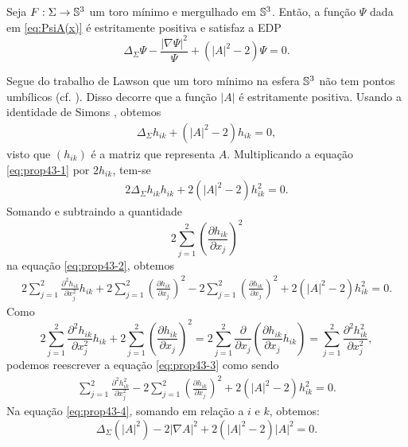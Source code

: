 \begin{proposicao}\label{edp_principal}
Seja $F:\Sigma\to\mathbb{S}^3$ um toro m\'inimo e mergulhado em $\mathbb{S}^3$.
Então, a função $\Psi$ dada em \eqref{eq:PsiA(x)} \'e estritamente 
positiva e satisfaz a EDP
\[
\Delta_\Sigma \Psi - \frac{|\nabla \Psi|^2}{\Psi} + (|A|^2 - 2) \Psi = 0.
\]
\end{proposicao}
\begin{demonstracao}
Segue do trabalho de Lawson que um toro m\'inimo na esfera $\mathbb{S}^3$
n\~ao tem pontos umb\'ilicos (cf. \cite[Proposition 1.5]{Lawson1970}).
Disso decorre que a função $|A|$ \'e estritamente positiva. Usando a
identidade de Simons \cite[Theorem 5.3.1]{Simons1968}, obtemos
\begin{eqnarray} \label{eq:prop43-1}
\Delta_{\Sigma} h_{ik} + (|A|^2 - 2)h_{ik} = 0,
\end{eqnarray}	
visto que $(h_{ik})$ \'e a matriz que representa $A$. Multiplicando a
equa\c c\~ao \eqref{eq:prop43-1} por $2 h_{ik}$, tem-se
\begin{eqnarray} \label{eq:prop43-2}
2 \Delta_{\Sigma} h_{ik} h_{ik} + 2 (|A|^2 - 2)h_{ik}^2 = 0.
\end{eqnarray}	
Somando e subtraindo a quantidade
\[
2 \sum_{j=1}^2 \left( \frac{\partial h_{ik}}{\partial x_j} \right)^2
\]
na equa\c c\~ao \eqref{eq:prop43-2}, obtemos
\begin{eqnarray} \label{eq:prop43-3}
2 \sum_{j=1}^2 \frac{\partial^2 h_{ik}}{\partial x_j^2} h_{ik} + 2 \sum_{j=1}^2 \left( \frac{\partial h_{ik}}{\partial x_j} \right)^2 - 2 \sum_{j=1}^2 \left( \frac{\partial h_{ik}}{\partial x_j} \right)^2 + 2 (|A|^2 - 2)h_{ik}^2 = 0.
\end{eqnarray}	
Como 
\[
2 \sum_{j=1}^2 \frac{\partial^2 h_{ik}}{\partial x_j^2} h_{ik} + 2 \sum_{j=1}^2 \left( \frac{\partial h_{ik}}{\partial x_j} \right)^2 = 2 \sum_{j=1}^2 \frac{\partial }{\partial x_j} \left( \frac{\partial h_{ik}}{\partial x_j} h_{ik} \right) = \sum_{j=1}^2 \frac{\partial^2 h_{ik}^2}{\partial x_j^2},
\]
podemos reescrever a equa\c c\~ao \eqref{eq:prop43-3} como sendo
\begin{eqnarray} \label{eq:prop43-4}
\sum_{j=1}^2 \frac{\partial^2 h_{ik}^2}{\partial x_j^2} - 2 \sum_{j=1}^2 \left( \frac{\partial h_{ik}}{\partial x_j} \right)^2 + 2 (|A|^2 - 2)h_{ik}^2 = 0.
\end{eqnarray}
Na equa\c c\~ao \eqref{eq:prop43-4}, somando em rela\c c\~ao a $i$
e $k$, obtemos:
\begin{equation} \label{eq:prop43-5}
\Delta_{\Sigma} (|A|^2) - 2 | \nabla A |^2 + 2 (|A|^2 - 2) |A|^2 = 0.

\end{equation}
\end{demonstracao}

